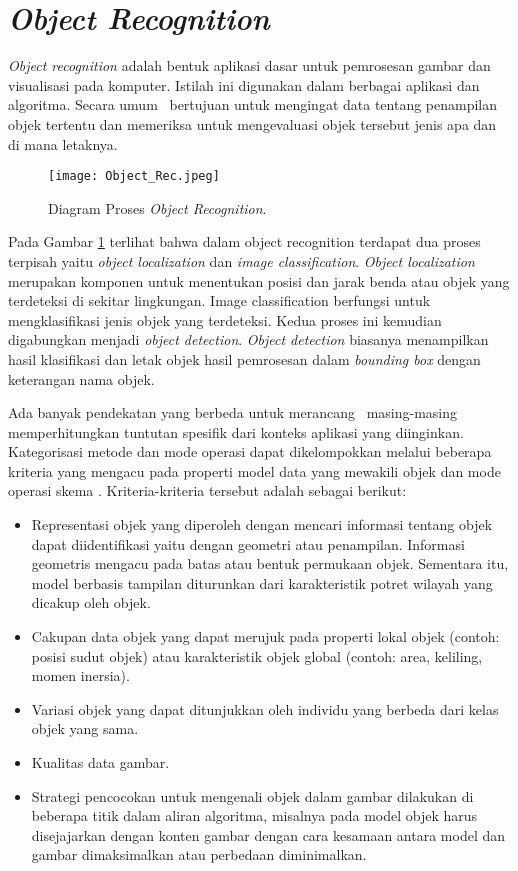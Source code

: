 \section{\textit{Object Recognition}}
\label{sec:object_detection} 

\textit{Object recognition} adalah bentuk aplikasi dasar untuk pemrosesan gambar dan visualisasi pada komputer. Istilah ini digunakan dalam berbagai aplikasi dan algoritma. Secara umum \objd\ bertujuan untuk mengingat data tentang penampilan objek tertentu dan memeriksa untuk mengevaluasi objek tersebut jenis apa dan di mana letaknya. 

\begin{figure}[H]
            \centering
            \texttt{[image: Object\_Rec.jpeg]}
            \caption{Diagram Proses \textit{Object Recognition}.}
            \label{fig:Ch02_objectR}
        \end{figure}

Pada Gambar \ref{fig:Ch02_objectR} terlihat bahwa dalam object recognition terdapat dua proses terpisah yaitu \textit{object localization} dan \textit{image classification}. \textit{Object localization} merupakan komponen untuk menentukan posisi dan jarak benda atau objek yang terdeteksi di sekitar lingkungan. Image classification berfungsi untuk mengklasifikasi jenis objek yang terdeteksi. Kedua proses ini kemudian digabungkan menjadi \textit{object detection}. \textit{Object detection} biasanya menampilkan hasil klasifikasi dan letak objek hasil pemrosesan dalam \textit{bounding box} dengan keterangan nama objek. 

Ada banyak pendekatan yang berbeda untuk merancang \objd\, masing-masing memperhitungkan tuntutan spesifik dari konteks aplikasi yang diinginkan. Kategorisasi metode dan mode operasi dapat dikelompokkan melalui beberapa kriteria yang mengacu pada properti model data yang mewakili objek dan mode operasi skema \objd. Kriteria-kriteria tersebut adalah sebagai berikut\cite{br2}:
\begin{itemize}
\item Representasi objek yang diperoleh dengan mencari informasi tentang objek dapat diidentifikasi yaitu dengan geometri atau penampilan. Informasi geometris mengacu pada batas atau  bentuk permukaan objek. Sementara itu, model berbasis tampilan diturunkan dari karakteristik potret wilayah yang dicakup oleh objek.
\item Cakupan data objek yang dapat merujuk pada properti lokal objek (contoh: posisi sudut objek) atau karakteristik objek global (contoh: area, keliling, momen inersia).
\item Variasi objek yang dapat ditunjukkan oleh individu yang berbeda dari kelas objek yang sama.
\item Kualitas data gambar.
\item Strategi pencocokan untuk mengenali objek dalam gambar dilakukan di beberapa titik dalam aliran algoritma, misalnya pada model objek harus disejajarkan dengan konten gambar dengan cara kesamaan antara model dan gambar dimaksimalkan atau perbedaan diminimalkan.
\end{itemize}

